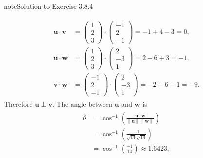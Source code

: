 \documentclass[letterpaper,10pt,english]{jupyterBook}
\begin{document}
\begin{sphinxadmonition}{note}{Solution to Exercise 3.8.4}


\begin{equation*}
\begin{split} \begin{align*}
    \mathbf{u} \cdot \mathbf{v} &= \begin{pmatrix} 1 \\ 2 \\ 3 \end{pmatrix} \cdot
    \begin{pmatrix} -1 \\ 2 \\ -1 \end{pmatrix} = -1 + 4 - 3 = 0, \\
    \mathbf{u} \cdot \mathbf{w} &= \begin{pmatrix} 1 \\ 2 \\ 3 \end{pmatrix} \cdot
    \begin{pmatrix} 2 \\ -3 \\ 1 \end{pmatrix} = 2 - 6 + 3 = -1, \\
    \mathbf{v} \cdot \mathbf{w} &= \begin{pmatrix} -1 \\ 2 \\ -1 \end{pmatrix} \cdot
    \begin{pmatrix} 2 \\ -3 \\ 1 \end{pmatrix} = -2 -6 -1 =  -9.
\end{align*} \end{split}
\end{equation*}
\sphinxAtStartPar
Therefore \(\mathbf{u} \perp \mathbf{v}\). The angle between \(\mathbf{u}\) and \(\mathbf{w}\) is
\begin{equation*}
\begin{split} \begin{align*}
    \theta &= \cos^{-1} \left( \frac{\mathbf{u} \cdot \mathbf{w}}{\|\mathbf{u} \|\|\mathbf{w}\|} \right) \\
    &= \cos^{-1} \left( \frac{-1}{\sqrt{14}\sqrt{14}}\right) \\
    &= \cos^{-1}\left(\frac{-1}{14}\right) \approx 1.6423,
\end{align*} \end{split}

\end{equation*}
\end{sphinxadmonition}
\end{document}

